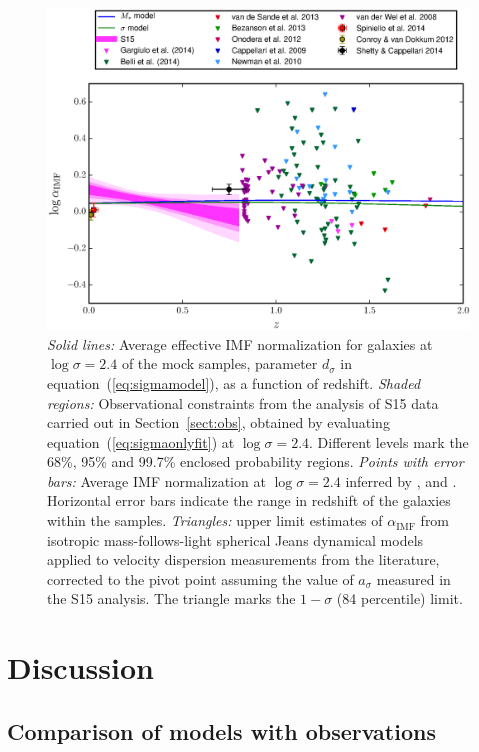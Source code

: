 \documentclass[usenatbib]{mnras}
\def\aimf{\alpha_{\mathrm{IMF}}}
\def\Sref#1{Section~\ref{#1}\xspace}
\def\Eref#1{equation~(\ref{#1})\xspace}
\begin{document}
\begin{figure}
 \includegraphics[width=\textwidth]{timeevol.eps}
 \caption{ {\em Solid lines:} Average effective IMF
   normalization for galaxies at 
   $\log{\sigma}=2.4$ of the mock samples, parameter $d_\sigma$ in 
   \Eref{eq:sigmamodel}, as a function of redshift.  {\em Shaded
     regions:} Observational constraints from the analysis of S15 data
   carried out in \Sref{sect:obs}, obtained by evaluating
   \Eref{eq:sigmaonlyfit} at $\log{\sigma}=2.4$. Different levels mark the 68\%,
   95\% and 99.7\% enclosed probability regions.  {\em Points with
     error bars:} Average IMF normalization at 
   $\log{\sigma}=2.4$ inferred by \citet{CvD12}, \citet{Spi++14} and
   \citet{S+C14}. Horizontal error bars indicate the range in redshift
   of the galaxies within the samples.  {\em Triangles:}
   upper limit estimates of $\aimf$ from isotropic mass-follows-light spherical
   Jeans dynamical models applied to velocity dispersion measurements
   from the literature, corrected to the pivot point assuming the value
   of $a_\sigma$ measured in the S15 analysis. The triangle 
   marks the $1-\sigma$ (84 percentile) limit.
   }
 \label{fig:bevol}
\end{figure}
%
\section{Discussion}\label{sect:discuss} 


\subsection{Comparison of models with observations}
\end{document}
